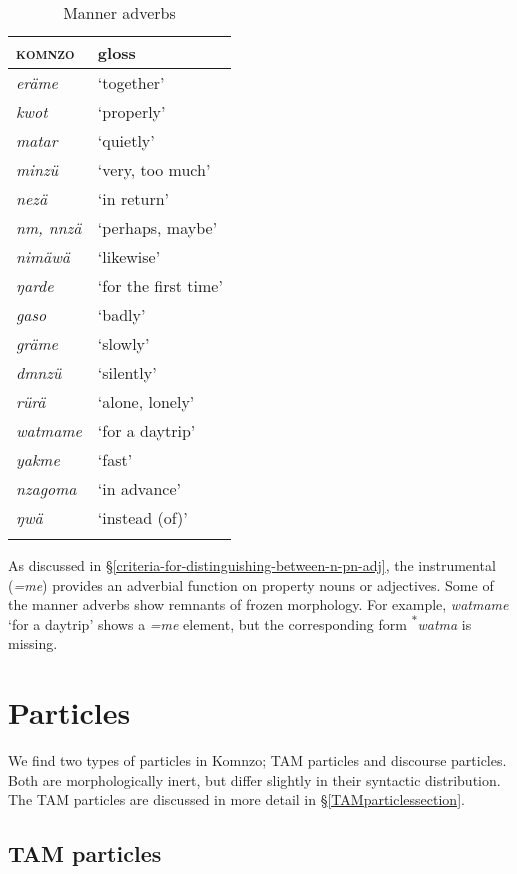 \begin{table}
\caption{Manner adverbs}
\label{manner-adverbs}
	\begin{tabularx}{\textwidth}{Xl}
		\lsptoprule
		\textsc{komnzo}&{gloss}\\\midrule
		\emph{eräme}&`together'\\
		\emph{kwot}&`properly'\\
		\emph{matar}&`quietly'\\
		\emph{minzü}&`very, too much'\\
		\emph{nezä}&`in return'\\
		\emph{nm, nnzä}&`perhaps, maybe'\\
		\emph{nimäwä}&`likewise'\\
		\emph{ŋarde}&`for the first time'\\
		\emph{gaso}&`badly'\\
		\emph{gräme}&`slowly'\\
		\emph{dmnzü}&`silently'\\
		\emph{rürä}&`alone, lonely'\\
		\emph{watmame}&`for a daytrip'\\
		\emph{yakme}&`fast'\\
		\emph{nzagoma}&`in advance'\\
		\emph{ŋwä}&`instead (of)'\\
		\lspbottomrule
	\end{tabularx}
\end{table}%

As discussed in \S{}\ref{criteria-for-distinguishing-between-n-pn-adj}, the instrumental  (\emph{=me}) provides an adverbial function on property nouns or adjectives. Some of the manner adverbs show remnants of frozen morphology. For example, \emph{watmame} `for a daytrip' shows a \emph{=me} element, but the corresponding form \textsuperscript{$\ast$}\emph{watma} is missing.

\section{Particles} \label{particles}

We find two types of particles in Komnzo; TAM particles and discourse particles. Both are morphologically inert, but differ slightly in their syntactic distribution. The TAM particles are discussed in more detail in \S{}\ref{TAMparticlessection}.

\subsection{TAM particles} \label{tamparticles}

